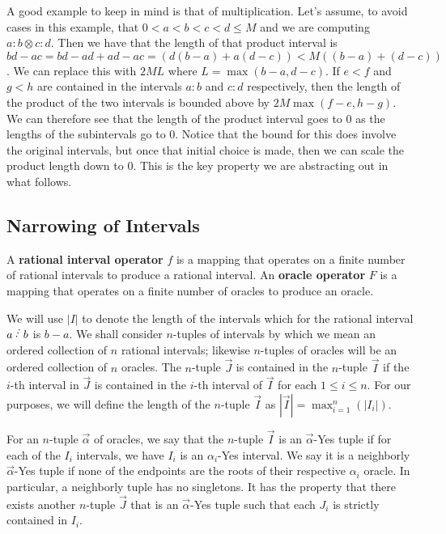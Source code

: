 \documentclass[12pt]{article}
\begin{document}
A good example to keep in mind is that of multiplication. Let's assume, to avoid cases in this example, that  $0 < a < b < c < d \leq M$ and we are computing $a:b \otimes c:d$. Then we have that the length of that product interval is $bd-ac = bd-ad+ad - ac= (d(b-a) + a(d-c))< M ( ( b-a) + (d-c) )$. We can replace this with $2ML$ where $L = \max(b-a, d-c)$. If $e\lt f$ and $g\lt h$ are contained in the intervals $a:b$ and $c:d$ respectively, then the length of the product of the two intervals is bounded above by $2M\max(f-e, h-g)$. We can therefore see that the length of the product interval goes to 0 as the lengths of the subintervals go to 0. Notice that the bound for this does involve the original intervals, but once that initial choice is made, then we can scale the product length down to 0. This is the key property we are abstracting out in what follows. 

\subsection{Narrowing of Intervals}\label{sec:nrwint}

A \textbf{rational interval operator} $f$ is a mapping that operates on a finite number of rational intervals to produce a rational interval. An \textbf{oracle operator} $F$ is a mapping that operates on a finite number of oracles to produce an oracle.

We will use $|I|$ to denote the length of the intervals which for the rational interval $a\lte b$ is $b-a$. We shall consider $n$-tuples of intervals by which we mean an ordered collection of $n$ rational intervals; likewise $n$-tuples of oracles will be an ordered collection of $n$ oracles. The $n$-tuple $\vec{J}$ is contained in the $n$-tuple $\vec{I}$ if the $i$-th interval in $\vec{J}$ is contained in the $i$-th interval of $\vec{I}$ for each $1 \leq i \leq n$. For our purposes, we will define the length of the $n$-tuple $\vec{I}$ as $|\vec{I}| = \max_{i=1}^n (|I_i|)$.

For an $n$-tuple $\vec{\alpha}$ of oracles, we say that the $n$-tuple $\vec{I}$ is an $\vec{\alpha}$-Yes tuple if for each of the $I_i$ intervals, we have $I_i$ is an $\alpha_i$-Yes interval. We say it is a neighborly $\vec{\alpha}$-Yes tuple if none of the endpoints are the roots of their respective $\alpha_i$ oracle. In particular, a neighborly tuple has no singletons. It has the property that there exists another $n$-tuple $\vec{J}$ that is an $\vec{\alpha}$-Yes tuple such that each $J_i$ is strictly contained in $I_i$. 
\end{document}
